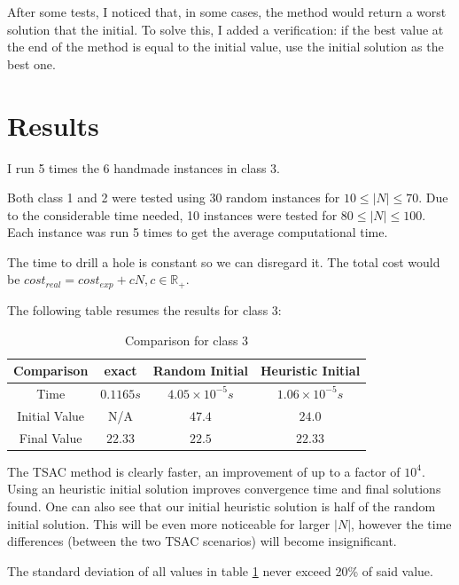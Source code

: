 \documentclass[a4paper,12pt]{article}
\begin{document}
			After some tests, I noticed that, in some cases, the method would return a worst solution that the initial.
			To solve this, I added a verification: if the best value at the end of the method is equal to the initial value, use the initial solution as the best one.
			
						
	
	\section{Results}
		I run 5 times the 6 handmade instances in class 3. 
		
		Both class 1 and 2 were tested using 30 random instances for $ 10 \le |N| \le 70 $.
		Due to the considerable time needed, 10 instances were tested for $ 80 \le |N| \le 100 $.
		Each instance was run 5 times to get the average computational time.
		
		The time to drill a hole is constant so we can disregard it.
		The total cost would be $ cost_{real}  = cost_{exp} + cN, c\in \mathbb{R}_+$.
		
		
		The following table resumes the results for class 3:
		\begin{table}[H]
			\centering
			\begin{tabular}{c|c|c|c}
				\textbf{Comparison}	& \textbf{exact} 	& \textbf{Random Initial}  		& \textbf{Heuristic Initial}  \\ \hline
				Time				& $ 0.1165 s $ 		& $ 4.05 \times 10^{-5} s $ 	& $ 1.06 \times 10^{-5} s $ \\ \hline
				Initial Value		& N/A		 		& $ 47.4 $ 						& $ 24.0 $ 					\\ \hline 
				Final Value			& $ 22.33 $	 		& $ 22.5 $ 						& $ 22.33 $ 				\\  
			\end{tabular}
			\caption{Comparison for class 3}
			\label{table:times3}
		\end{table}
	
		The TSAC method is clearly faster, an improvement of up to a factor of $ 10^4 $.
		Using an heuristic initial solution improves convergence time and final solutions found.
		One can also see that our initial heuristic solution is half of the random initial solution.
		This will be even more noticeable for larger $ |N| $, however the time differences (between the two TSAC scenarios) will become insignificant.
		
		The standard deviation of all values in table \ref{table:times3} never exceed 20\% of said value.
		
\end{document}
